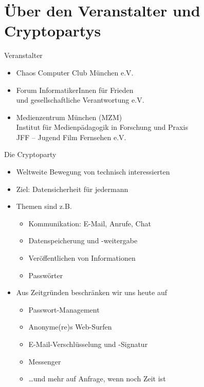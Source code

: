 \section{Über den Veranstalter und Cryptopartys}
\begin{frame}{Veranstalter}
  \begin{itemize}
    \item Chaos Computer Club München e.V.
    \item Forum InformatikerInnen für Frieden\\und gesellschaftliche Verantwortung e.V.
    \item Medienzentrum München (MZM)\\Institut für Medienpädagogik in Forschung und Praxis\\JFF -- Jugend Film Fernsehen e.V.
  \end{itemize}
\end{frame}

\begin{frame}{Die Cryptoparty}
  \begin{itemize}
    \item Weltweite Bewegung von technisch interessierten
    \item Ziel: Datensicherheit für jedermann
    \item Themen sind z.B.
    \begin{itemize}
      \item Kommunikation: E-Mail, Anrufe, Chat
      \item Datenspeicherung und -weitergabe
      \item Veröffentlichen von Informationen
      \item Passwörter
    \end{itemize}
    \item Aus Zeitgründen beschränken wir uns heute auf
    \begin{itemize}
      \item Passwort-Management
      \item Anonyme(re)s Web-Surfen
      \item E-Mail-Verschlüsselung und -Signatur
      \item Messenger
      \item \ldots und mehr auf Anfrage, wenn noch Zeit ist
    \end{itemize}
  \end{itemize}
\end{frame}

\endinput

